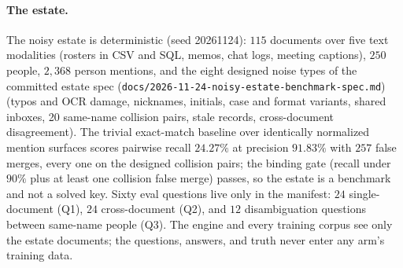 \documentclass{article}
\begin{document}
\paragraph{The estate.}
The noisy estate is deterministic (seed 20261124): $115$ documents over five text modalities (rosters in CSV and SQL, memos, chat logs, meeting captions), $250$ people, $2{,}368$ person mentions, and the eight designed noise types of the committed estate spec (\texttt{docs/2026-11-24-noisy-estate-}\allowbreak\texttt{benchmark-spec.md}) (typos and OCR damage, nicknames, initials, case and format variants, shared inboxes, 20 same-name collision pairs, stale records, cross-document disagreement). The trivial exact-match baseline over identically normalized mention surfaces scores pairwise recall $24.27\%$ at precision $91.83\%$ with $257$ false merges, every one on the designed collision pairs; the binding gate (recall under $90\%$ plus at least one collision false merge) passes, so the estate is a benchmark and not a solved key. Sixty eval questions live only in the manifest: $24$ single-document (Q1), $24$ cross-document (Q2), and $12$ disambiguation questions between same-name people (Q3). The engine and every training corpus see only the estate documents; the questions, answers, and truth never enter any arm's training data.
\end{document}
